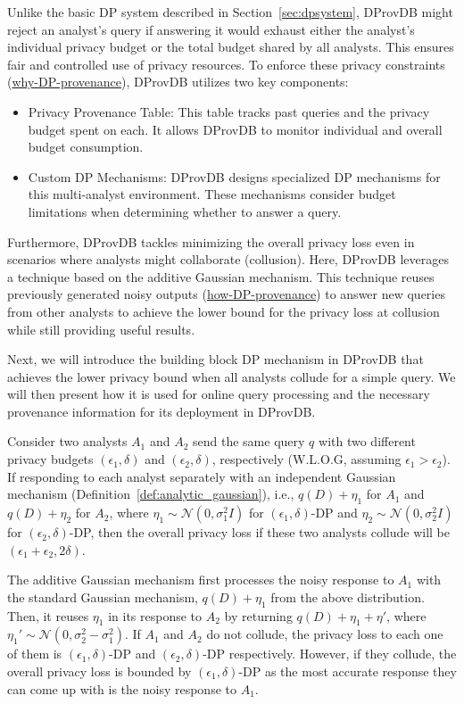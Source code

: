 Unlike the basic DP system described in Section~\ref{sec:dpsystem}, DProvDB might reject an analyst's query if answering it would exhaust either the analyst's individual privacy budget or the total budget shared by all analysts. This ensures fair and controlled use of privacy resources. To enforce these privacy constraints (\underline{why-DP-provenance}), DProvDB utilizes two key components:
\begin{itemize}
    \item Privacy Provenance Table: This table tracks past queries and the privacy budget spent on each. It allows DProvDB to monitor individual and overall budget consumption.
    \item Custom DP Mechanisms: DProvDB designs specialized DP mechanisms for this multi-analyst environment. These mechanisms consider budget limitations when determining whether to answer a query. 
\end{itemize}
Furthermore, DProvDB tackles minimizing the overall privacy loss even in scenarios where analysts might collaborate (collusion). Here, DProvDB leverages a technique based on the additive Gaussian mechanism. This technique reuses previously generated noisy outputs (\underline{how-DP-provenance}) to answer new queries from other analysts to achieve the lower bound for the privacy loss at collusion while still providing useful results. 

Next, we will introduce the building block DP mechanism in DProvDB that achieves the lower privacy bound when all analysts collude for a simple query. We will then present how it is used for online query processing and the necessary provenance information for its deployment in DProvDB.

Consider two analysts $A_1$ and $A_2$ send the same query $q$ with two different privacy budgets $(\epsilon_1,\delta)$ and $(\epsilon_2,\delta)$, respectively (W.L.O.G, assuming $\epsilon_1 > \epsilon_2$). If responding to each analyst separately with an independent Gaussian mechanism (Definition~\ref{def:analytic_gaussian}), i.e., $q(D)+\eta_1$ for $A_1$ and $q(D)+\eta_2$ for $A_2$, where $\eta_1\sim \mathcal{N}(0,\sigma^2_1I)$ for $(\epsilon_1,\delta)$-DP and $\eta_2\sim \mathcal{N}(0,\sigma^2_2I)$ for $(\epsilon_2,\delta)$-DP, then the overall privacy loss if these two analysts collude will be $(\epsilon_1+\epsilon_2,2\delta)$.

The additive Gaussian mechanism first processes the noisy response to $A_1$ with the standard Gaussian mechanism, $q(D)+\eta_1$ from the above distribution. Then, it reuses $\eta_1$ in its response to $A_2$ by returning $q(D)+\eta_1+\eta'$, where $\eta_1'\sim \mathcal{N}(0, \sigma_2^2-\sigma_1^2)$. If $A_1$ and $A_2$ do not collude, the privacy loss to each one of them is $(\epsilon_1,\delta)$-DP and $(\epsilon_2,\delta)$-DP respectively. However, if they collude, the overall privacy loss is bounded by $(\epsilon_1,\delta)$-DP as the most accurate response they can come up with is the noisy response to $A_1$.


